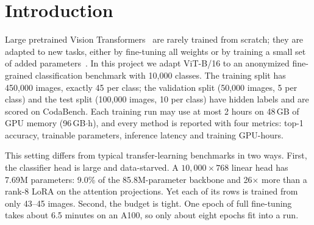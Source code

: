 \section{Introduction}
\label{sec:intro}

Large pretrained Vision Transformers~\cite{dosovitskiy2021vit,steiner2022augreg} are rarely trained from scratch; they are adapted to new tasks, either by fine-tuning all weights or by training a small set of added parameters~\cite{houlsby2019adapter,hu2022lora,chen2022adaptformer}.
In this project we adapt ViT-B/16 to an anonymized fine-grained classification benchmark with 10,000 classes.
The training split has 450,000 images, exactly 45 per class; the validation split (50,000 images, 5 per class) and the test split (100,000 images, 10 per class) have hidden labels and are scored on CodaBench.
Each training run may use at most 2 hours on 48\,GB of GPU memory (96\,GB$\cdot$h), and every method is reported with four metrics: top-1 accuracy, trainable parameters, inference latency and training GPU-hours.

This setting differs from typical transfer-learning benchmarks in two ways.
First, the classifier head is large and data-starved.
A $10{,}000 \times 768$ linear head has 7.69M parameters: 9.0\% of the 85.8M-parameter backbone and 26$\times$ more than a rank-8 LoRA on the attention projections.
Yet each of its rows is trained from only 43--45 images.
Second, the budget is tight.
One epoch of full fine-tuning takes about 6.5 minutes on an A100, so only about eight epochs fit into a run.

